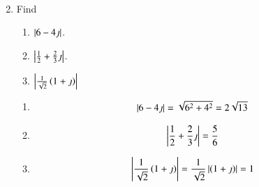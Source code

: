\begin{enumerate}[label=\arabic*.,ref=\thesubsection.\theenumi]
\begin{align}
				\end{align}
			\item Find
\begin{enumerate}
	\item $\left\vert6 -4\jmath\right\vert$.
	\item $\left\vert\frac{1}{2} +\frac{2}{3}\jmath\right\vert$.
	\item $\left\vert\frac{1}{\sqrt{2}}\left(1+\jmath\right)\right\vert$
\end{enumerate}
\solution 
\begin{enumerate}
	\item 
				\begin{align}
					\left\vert6 -4\jmath\right\vert = \sqrt{6^2 + 4^2} = 2 \sqrt{13}
				\end{align}
			\item  				\begin{align}
					\left\vert\frac{1}{2} +\frac{2}{3}\jmath\right\vert = \frac{5}{6}
				\end{align}
\item  				\begin{align}
		\left\vert\frac{1}{\sqrt{2}}\left(1+\jmath\right)\right\vert = \frac{1}{\sqrt{2}}\left\vert\left(1+\jmath\right)\right\vert = 1
\end{align}



\end{enumerate}
\end{enumerate}
